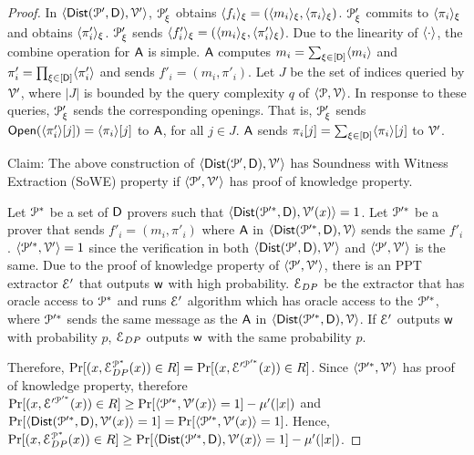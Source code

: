 \begin{proof}
	In $\langle \mathsf{Dist}(\mathcal{P}', \mathsf{D}),\mathcal{V}'\rangle$, $\mathcal{P}_\xi'$ obtains $\langle f_i \rangle_{\xi} = (\langle m_i \rangle_{\xi}, \langle \pi_i \rangle_{\xi})$. $\mathcal{P}_\xi'$ commits to $\langle \pi_i \rangle_{\xi}$ and obtains $\langle \pi'_i \rangle_{\xi}$. $\mathcal{P}_\xi'$ sends $\langle f'_i \rangle_{\xi} = (\langle m_i \rangle_{\xi}, \langle \pi'_i \rangle_{\xi})$. Due to the linearity of $\langle \cdot \rangle$, the combine operation for $\mathsf{A}$ is simple. $\mathsf{A}$ computes $m_i = \sum_{\xi\in [\mathsf{D}]} \langle m_i \rangle$ and $\pi'_i = \prod_{\xi \in [\mathsf{D}]} \langle \pi'_i \rangle$ and sends $f'_i = (m_i,\pi'_i)$.
	Let $J$ be the set of indices queried by $\mathcal{V}'$, where $|J|$ is bounded by the query complexity $q$ of $\langle \mathcal{P},\mathcal{V}\rangle$. In response to these queries, $\mathcal{P}_\xi'$ sends the corresponding openings. That is, $\mathcal{P}_\xi'$ sends $\mathsf{Open}(\langle \pi'_i \rangle[j]) = \langle \pi_i \rangle[j]$ to $\mathsf{A}$, for all $j \in J$. $\mathsf{A}$ sends $\pi_i[j] = \sum_{\xi\in [\mathsf{D}]} \langle \pi_i \rangle[j]$ to $\mathcal{V}'$.
	
	Claim: The above construction of $\langle \mathsf{Dist}(\mathcal{P}', \mathsf{D}),\mathcal{V}'\rangle$ has Soundness with Witness Extraction (SoWE) property if $\langle \mathcal{P}',\mathcal{V}'\rangle$ has proof of knowledge property. 
	
	Let $\mathcal{P}^\ast$ be a set of $\mathsf{D}$ provers such that $\langle \mathsf{Dist}(\mathcal{P}'^\ast, \mathsf{D}),\mathcal{V}'({x})\rangle = 1$. Let $\mathcal{P}'^\ast$ be a prover that sends $f'_i = (m_i, \pi'_i)$ where $\mathsf{A}$ in $\langle \mathsf{Dist}(\mathcal{P}'^\ast, \mathsf{D}),\mathcal{V}\rangle$ sends the same $f'_i$. 
	$\langle \mathcal{P}'^\ast,\mathcal{V}'\rangle = 1$ since the verification in both $\langle \mathsf{Dist}(\mathcal{P}', \mathsf{D}),\mathcal{V}'\rangle$ and $\langle \mathcal{P}',\mathcal{V}'\rangle$ is the same. Due to the proof of knowledge property of $\langle \mathcal{P}',\mathcal{V}'\rangle$, there is an PPT extractor $\mathcal{E}'$ that outputs $\mathsf{w}$ with high probability. $\mathcal{E}_{DP}$ be the extractor that has oracle access to $\mathcal{P}^\ast$ and runs $\mathcal{E}'$ algorithm which has oracle access to the $\mathcal{P}'^\ast$, where $\mathcal{P}'^\ast$ sends the same message as the $\mathsf{A}$ in $\langle \mathsf{Dist}(\mathcal{P}'^\ast, \mathsf{D}),\mathcal{V}\rangle$. If $\mathcal{E}'$ outputs $\mathsf{w}$ with probability $p$, $\mathcal{E}_{DP}$ outputs $\mathsf{w}$ with the same probability $p$.
	
	Therefore, $\Pr[({x}, \mathcal{E}_{DP}^{\mathcal{P}^\ast}({x})) \in R] = \Pr[({x}, \mathcal{E}'^{\mathcal{P}'^\ast}({x})) \in R]$.
	Since $\langle \mathcal{P}'^\ast,\mathcal{V}'\rangle$ has proof of knowledge property, therefore $\Pr[({x}, \mathcal{E}'^{\mathcal{P}'^\ast}({x})) \in R] \geq \Pr[\langle \mathcal{P}'^\ast,\mathcal{V}'({x})\rangle = 1] - \mu'(|{x}|)$ and 
	$\Pr[\langle \mathsf{Dist}(\mathcal{P}'^\ast, \mathsf{D}),\mathcal{V}'({x})\rangle = 1] = \Pr[\langle \mathcal{P}'^\ast,\mathcal{V}'({x})\rangle = 1]$.
	Hence, $\Pr[({x}, \mathcal{E}_{DP}^{\mathcal{P}^\ast}({x})) \in R] \geq \Pr[\langle \mathsf{Dist}(\mathcal{P}'^\ast, \mathsf{D}),\mathcal{V}'({x})\rangle = 1] - \mu'(|{x}|)$.
	

\end{proof}

